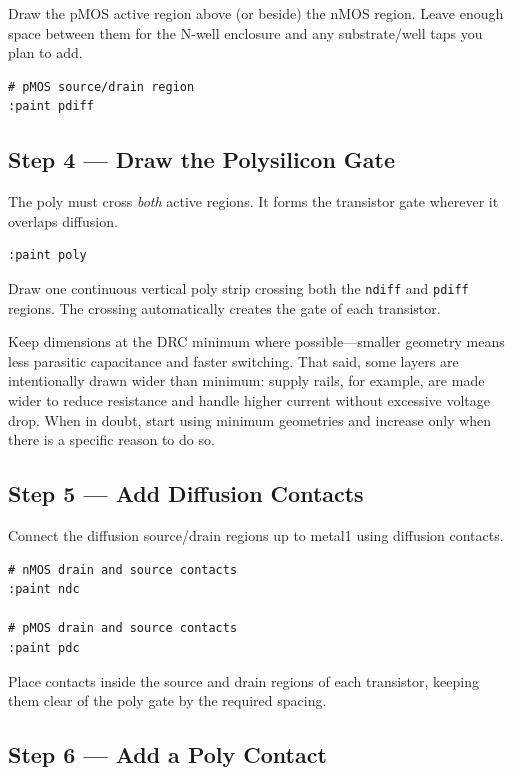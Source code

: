 \documentclass[11pt]{article}
\begin{document}
Draw the pMOS active region above (or beside) the nMOS region.
Leave enough space between them for the N-well enclosure and any
substrate/well taps you plan to add.

\begin{lstlisting}
# pMOS source/drain region
:paint pdiff
\end{lstlisting}

\subsection{Step 4 --- Draw the Polysilicon Gate}

The poly must cross \emph{both} active regions.
It forms the transistor gate wherever it overlaps diffusion.

\begin{lstlisting}
:paint poly
\end{lstlisting}

Draw one continuous vertical poly strip crossing both the
\texttt{ndiff} and \texttt{pdiff} regions.
The crossing automatically creates the gate of each transistor.

\begin{tipbox}
Keep dimensions at the DRC minimum where possible---smaller geometry
means less parasitic capacitance and faster switching.
That said, some layers are intentionally drawn wider than minimum:
supply rails, for example, are made wider to reduce resistance and
handle higher current without excessive voltage drop.
When in doubt, start using minimum geometries
and increase only when there is a
specific reason to do so.
\end{tipbox}

\subsection{Step 5 --- Add Diffusion Contacts}

Connect the diffusion source/drain regions up to metal1 using diffusion
contacts.

\begin{lstlisting}
# nMOS drain and source contacts
:paint ndc

# pMOS drain and source contacts
:paint pdc
\end{lstlisting}

Place contacts inside the source and drain regions of each transistor,
keeping them clear of the poly gate by the required spacing.

\subsection{Step 6 --- Add a Poly Contact}
\end{document}
